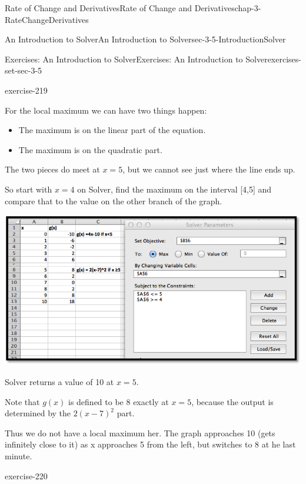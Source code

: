 \documentclass[oneside,10pt,]{book}
\numberwithin{equation}{section}
\begin{document}
\begin{chapterptx}{Rate of Change and Derivatives}{}{Rate of Change and Derivatives}{}{}{chap-3-RateChangeDerivatives}
\begin{sectionptx}{An Introduction to Solver}{}{An Introduction to Solver}{}{}{sec-3-5-IntroductionSolver}
\begin{exercises-subsection-numberless}{Exercises: An Introduction to Solver}{}{Exercises: An Introduction to Solver}{}{}{exercises-set-sec-3-5}
\begin{divisionexercise}{9}{}{}{exercise-219}
\begin{enumerate}[label=(\alph*)]
\par
\hypertarget{p-1409}{}%
For the local maximum we can have two things happen:%
%
\begin{itemize}[label=\textbullet]
\item{}\hypertarget{p-1410}{}%
The maximum is on the linear part of the equation.%
\item{}\hypertarget{p-1411}{}%
The maximum is on the quadratic part.%
\end{itemize}
\hypertarget{p-1412}{}%
The two pieces do meet at \(x = 5\), but we cannot see just where the line ends up.%
\par
\hypertarget{p-1413}{}%
So start with \(x = 4\) on Solver, find the maximum on the interval [4,5] and compare that to the value on the other branch of the graph.%
\begin{sidebyside}{1}{0.05}{0.05}{0}%
\begin{sbspanel}{0.9}%
\includegraphics[width=1\linewidth]{images/sec3-5-sol9b.png}
\end{sbspanel}%
\end{sidebyside}%
\par
\hypertarget{p-1414}{}%
Solver returns a value of 10 at \(x = 5\).%
\par
\hypertarget{p-1415}{}%
Note that \(g(x)\) is defined to be 8 exactly at \(x = 5\), because the output is determined by the \(2(x-7)^2\)  part.%
\par
\hypertarget{p-1416}{}%
Thus we do not have a local maximum her.  The graph approaches 10 (gets infinitely close to it) as x approaches 5 from the left, but switches to 8 at he last minute.%
\end{enumerate}
\end{divisionexercise}%
\begin{divisionexercise}{10}{}{}{exercise-220}%
\hypertarget{p-1417}{}%
%
\begin{equation*}

\end{equation*}
\end{divisionexercise}
\end{exercises-subsection-numberless}
\end{sectionptx}
\end{chapterptx}
\end{document}
